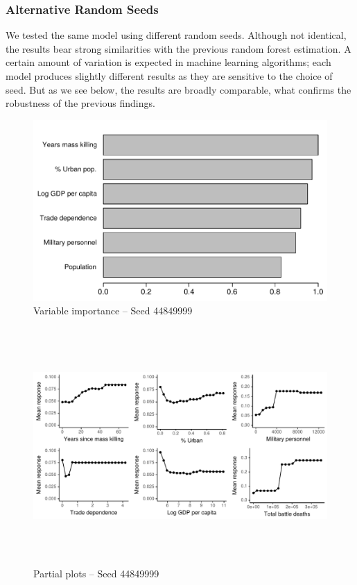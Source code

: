 \subsubsection{Alternative Random Seeds}

We tested the same model using different random seeds. Although not identical, the results bear strong similarities with the previous random forest estimation. A certain amount of variation is expected in machine learning algorithms; each model produces slightly different results as they are sensitive to the choice of seed. But as we see below, the results are broadly comparable, what confirms the robustness of the previous findings.

\begin{figure}[H]
    \centering
    \includegraphics{images/drf-mk2.pdf}
    \caption{Variable importance -- Seed 44849999}
    \label{fig:my_label}
\end{figure}

\begin{figure}[H]
    \centering
    \includegraphics[width=\textwidth, height=9cm]{images/drfdpp2.pdf}
    \caption{Partial plots -- Seed 44849999}
    \label{fig:my_label}
\end{figure}

